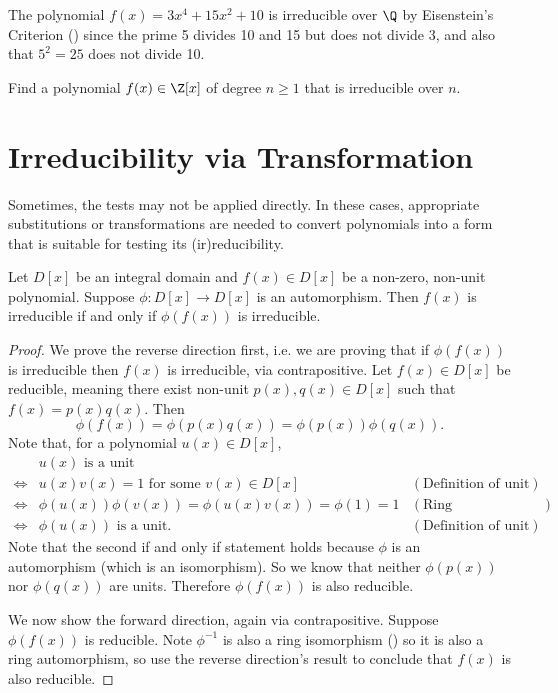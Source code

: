 \begin{example}
    The polynomial $f(x) = 3x^4 + 15x^2 + 10$ is irreducible over $\Q$ by Eisenstein's Criterion () since the prime 5 divides 10 and 15 but does not divide 3, and also that $5^2 = 25$ does not divide 10.
\end{example}

\begin{exercise}
    Find a polynomial $f(x) \in \Z[x]$ of degree $n \geq 1$ that is irreducible over $n$.
\end{exercise}

\section{Irreducibility via Transformation}
Sometimes, the tests may not be applied directly. In these cases, appropriate substitutions or transformations are needed to convert polynomials into a form that is suitable for testing its (ir)reducibility.

\begin{theorem}\label{thrm-transformation-rule-for-irreducibility}
    Let $D[x]$ be an integral domain and $f(x) \in D[x]$ be a non-zero, non-unit polynomial. Suppose $\phi: D[x] \to D[x]$ is an automorphism. Then $f(x)$ is irreducible if and only if $\phi(f(x))$ is irreducible.
\end{theorem}
\begin{proof}
    We prove the reverse direction first, i.e. we are proving that if $\phi(f(x))$ is irreducible then $f(x)$ is irreducible, via contrapositive. Let $f(x) \in D[x]$ be reducible, meaning there exist non-unit $p(x), q(x) \in D[x]$ such that $f(x) = p(x)q(x)$. Then
    \[
        \phi(f(x)) = \phi(p(x)q(x)) = \phi(p(x))\phi(q(x)).
    \]
    Note that, for a polynomial $u(x) \in D[x]$,
    \begin{align*}
        &u(x) \text{ is a unit}\\
        \iff&u(x)v(x) = 1 \text{ for some }v(x) \in D[x] & (\text{Definition of unit})\\
        \iff&\phi(u(x))\phi(v(x))  = \phi(u(x)v(x)) = \phi(1) = 1 & (\text{Ring homomorphism properties})\\
        \iff&\phi(u(x)) \text{ is a unit.} & (\text{Definition of unit})
    \end{align*}
    Note that the second if and only if statement holds because $\phi$ is an automorphism (which is an isomorphism). So we know that neither $\phi(p(x))$ nor $\phi(q(x))$ are units. Therefore $\phi(f(x))$ is also reducible.

    We now show the forward direction, again via contrapositive. Suppose $\phi(f(x))$ is reducible. Note $\phi^{-1}$ is also a ring isomorphism () so it is also a ring automorphism, so use the reverse direction's result to conclude that $f(x)$ is also reducible.
\end{proof}

